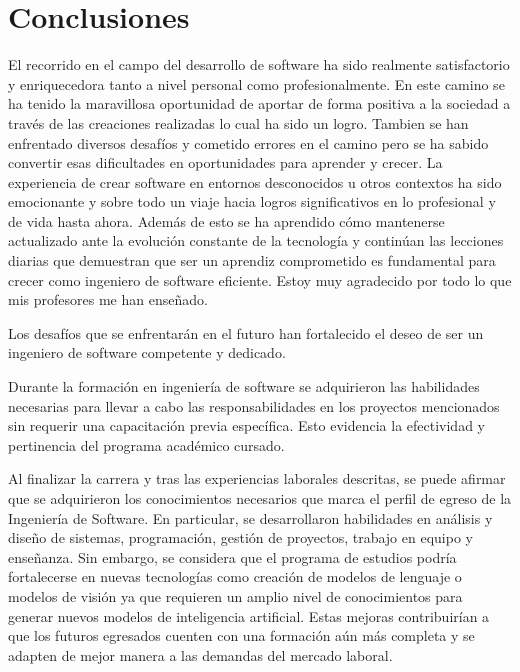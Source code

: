 \documentclass[protocolo.tex]{subfiles}
\begin{document}
\section{Conclusiones}
El recorrido en el campo del desarrollo de software ha sido realmente
satisfactorio y enriquecedora tanto a nivel personal como profesionalmente. 
En este camino se ha tenido la maravillosa oportunidad de aportar de forma 
positiva a la sociedad a través de las creaciones realizadas lo cual ha sido un logro.
Tambien se han enfrentado diversos desafíos y cometido errores en el camino pero se ha sabido convertir esas dificultades
en oportunidades para aprender y crecer. La experiencia de crear software en entornos desconocidos u otros contextos ha sido 
emocionante y sobre todo un viaje hacia logros significativos en lo profesional y de vida hasta ahora. Además de esto se ha aprendido cómo mantenerse actualizado ante la evolución constante de la tecnología y continúan las lecciones diarias que demuestran que ser un aprendiz comprometido es fundamental para crecer como ingeniero de software eficiente.
Estoy muy agradecido por todo lo que mis profesores me han enseñado.

Los desafíos que se enfrentarán en el futuro han fortalecido el deseo de ser un ingeniero de software competente y dedicado.

Durante la formación en ingeniería de software se adquirieron las habilidades necesarias para llevar a cabo las responsabilidades en los proyectos mencionados sin requerir una capacitación previa específica. Esto evidencia la efectividad y pertinencia del programa académico cursado.

Al finalizar la carrera y tras las experiencias laborales descritas, se puede afirmar que se  adquirieron los conocimientos necesarios que marca el perfil de egreso de la Ingeniería de Software. En particular, 
se desarrollaron habilidades en análisis y diseño de sistemas, programación, gestión de proyectos, trabajo en equipo y enseñanza. Sin embargo, se considera que el programa de estudios podría fortalecerse en nuevas tecnologías como creación de modelos de lenguaje o modelos de visión ya que requieren un amplio nivel de conocimientos para generar nuevos modelos de inteligencia artificial.  Estas mejoras contribuirían a que los futuros egresados cuenten con una formación aún más completa y se adapten de mejor manera a las demandas del mercado laboral.
\end{document}
